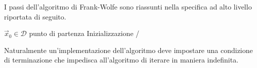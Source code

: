 I passi dell'algoritmo di Frank-Wolfe sono riassunti nella specifica ad alto livello riportata di seguito.
\begin{tcolorbox}[
    enhanced,
    borderline south = {0.5mm}{0pt}{primary},
    frame hidden,
    colback=white, %
    colbacktitle=primary, %
    boxrule=0pt,   %
    sharp corners, %
    left=1pt,
    top=1pt,
    right=0pt,
    bottom=1pt,
    adjusted title = Algoritmo di Frank-Wolfe,
    halign title = center,
    fonttitle = \alt\fontseries{mid}\selectfont,
]
\begin{algorithm}[H]
    $ \vec{x}_0 \in \mathcal{D} $ punto di partenza \hfill {\alt {\ttfamily /*}  Inizializzazione {\ttfamily */}} \\[10pt]
\end{algorithm}
\end{tcolorbox}
\noindent
Naturalmente un'implementazione dell'algoritmo deve impostare una condizione di terminazione che impedisca
all'algoritmo di iterare in maniera indefinita.
